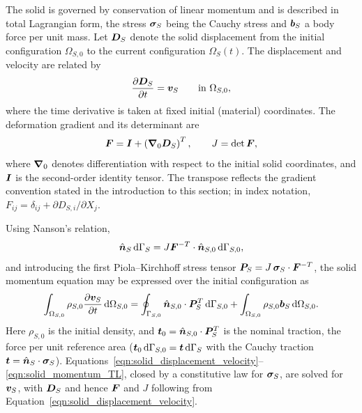 The solid is governed by conservation of linear momentum and is described in total Lagrangian form, the stress $\boldsymbol{\sigma}_S$ being the Cauchy stress and $\boldsymbol{b}_S$ a body force per unit mass.
Let $\boldsymbol{D}_S$ denote the solid displacement from the initial configuration $\Omega_{S,0}$ to the current configuration $\Omega_S(t)$.
The displacement and velocity are related by
\begin{equation}
    \frac{\partial \boldsymbol{D}_S}{\partial t}
    =
    \boldsymbol{v}_S
    \qquad
    \text{in } \Omega_{S,0},
    \label{eqn:solid_displacement_velocity}
\end{equation}
where the time derivative is taken at fixed initial (material) coordinates.
The deformation gradient and its determinant are
\begin{equation}
    \boldsymbol{F}
    =
    \boldsymbol{I}
    +
    \left( \boldsymbol{\nabla}_0 \boldsymbol{D}_S \right)^T,
    \qquad
    J = \det \boldsymbol{F},
    \label{eqn:deformation_gradient}
\end{equation}
where $\boldsymbol{\nabla}_0$ denotes differentiation with respect to the initial solid coordinates, and $\boldsymbol{I}$ is the second-order identity tensor.
The transpose reflects the gradient convention stated in the introduction to this section; in index notation, $F_{ij} = \delta_{ij} + \partial D_{S,i} / \partial X_j$.

Using Nanson's relation,
\begin{equation} \label{eqn:nanson}
    \hat{\boldsymbol{n}}_S \, \text{d}\Gamma_S
    =
    J \boldsymbol{F}^{-T} \cdot \hat{\boldsymbol{n}}_{S,0} \, \text{d}\Gamma_{S,0},
\end{equation}
and introducing the first Piola--Kirchhoff stress tensor $\boldsymbol{P}_S = J\, \boldsymbol{\sigma}_S \cdot \boldsymbol{F}^{-T}$, the solid momentum equation may be expressed over the initial configuration as
\begin{equation}
    \int_{\Omega_{S,0}}
    \rho_{S,0}
    \frac{\partial \boldsymbol{v}_S}{\partial t}
    \, \text{d}\Omega_{S,0}
    =
    \oint_{\Gamma_{S,0}}
    \hat{\boldsymbol{n}}_{S,0} \cdot \boldsymbol{P}_S^T
    \, \text{d}\Gamma_{S,0}
    +
    \int_{\Omega_{S,0}}
    \rho_{S,0} \boldsymbol{b}_S
    \, \text{d}\Omega_{S,0} .
    \label{eqn:solid_momentum_TL}
\end{equation}
Here $\rho_{S,0}$ is the initial density, and $\boldsymbol{t}_0 = \hat{\boldsymbol{n}}_{S,0} \cdot \boldsymbol{P}_S^T$ is the nominal traction, the force per unit reference area ($\boldsymbol{t}_0 \, \text{d}\Gamma_{S,0} = \boldsymbol{t} \, \text{d}\Gamma_S$ with the Cauchy traction $\boldsymbol{t} = \hat{\boldsymbol{n}}_S \cdot \boldsymbol{\sigma}_S$).
Equations~\eqref{eqn:solid_displacement_velocity}--\eqref{eqn:solid_momentum_TL}, closed by a constitutive law for $\boldsymbol{\sigma}_S$, are solved for $\boldsymbol{v}_S$, with $\boldsymbol{D}_S$ and hence $\boldsymbol{F}$ and $J$ following from Equation~\eqref{eqn:solid_displacement_velocity}.

